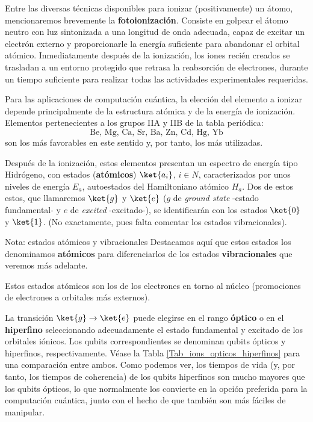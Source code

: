
Entre las diversas técnicas disponibles para ionizar (positivamente) un átomo, mencionaremos brevemente la \textbf{fotoionización}. Consiste en golpear el átomo neutro con luz sintonizada a una longitud de onda adecuada, capaz de excitar un electrón externo y proporcionarle la energía suficiente para abandonar el orbital atómico. Inmediatamente después de la ionización, los iones recién creados se trasladan a un entorno protegido que retrasa la reabsorción de electrones, durante un tiempo suficiente para realizar todas las actividades experimentales requeridas.

Para las aplicaciones de computación cuántica, la elección del elemento a ionizar depende principalmente de la estructura atómica y de la energía de ionización. Elementos pertenecientes a los grupos IIA y IIB de la tabla periódica:
\begin{equation*}
\text{Be, Mg, Ca, Sr, Ba, Zn, Cd, Hg, Yb}
\end{equation*}
son los más favorables en este sentido y, por tanto, los más utilizadas.

Después de la ionización, estos elementos presentan un espectro de energía tipo Hidrógeno, con estados (\textbf{atómicos}) $\ket{a_i}$, $i \in N$, caracterizados por unos niveles de energía $E_a$, autoestados del Hamiltoniano atómico $H_a$. Dos de estos estos, que llamaremos $\ket{g}$  y $\ket{e}$ ($g$ de \textit{ground state} -estado fundamental- y $e$ de \textit{excited} -excitado-), se identificarán con los estados $\ket{0}$ y $\ket{1}$. (No exactamente, pues falta comentar los estados vibracionales).

\begin{mybox_blue}{Nota: estados atómicos y vibracionales}
Destacamos aquí que estos estados los denominamos \textbf{atómicos} para diferenciarlos de los estados \textbf{vibracionales} que veremos más adelante. 

\vspace{0.3cm}
Estos estados atómicos son los de los electrones en torno al núcleo (promociones de electrones a orbitales más externos).
\end{mybox_blue}

La transición $\ket{g} \rightarrow \ket{e}$ puede elegirse en el rango \textbf{óptico} o en el \textbf{hiperfino} seleccionando adecuadamente el estado fundamental y excitado de los orbitales iónicos. Los qubits correspondientes se denominan qubits ópticos y hiperfinos, respectivamente. Véase la Tabla \ref{Tab_ions_opticos_hiperfinos} para una comparación entre ambos. Como podemos ver, los tiempos de vida (y, por tanto, los tiempos de coherencia) de los qubits hiperfinos son mucho mayores que los qubits ópticos, lo que normalmente los convierte en la opción preferida para la computación cuántica, junto con el hecho de que también son más fáciles de manipular.

